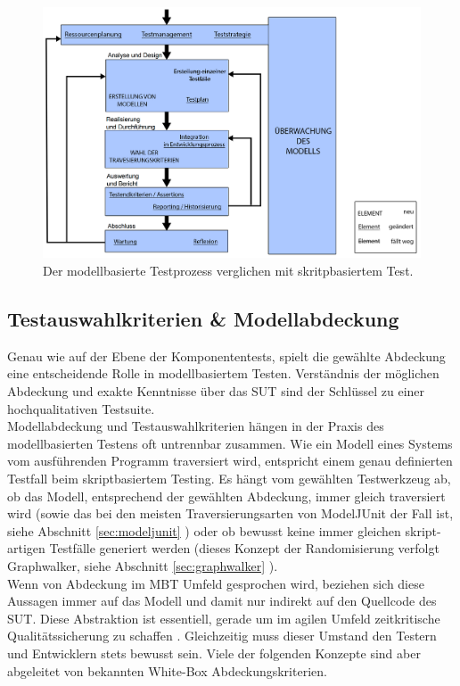 \begin{figure}[h] 
  \centering
     \includegraphics[width=1.1\textwidth]{figures/mbt_vergleich_skript.png}
  \caption{Der modellbasierte Testprozess verglichen mit skritpbasiertem Test.}
  \label{fig:script_vs_mbt}
\end{figure}

\subsection{Testauswahlkriterien \& Modellabdeckung}
\label{sec:coverage}

Genau wie auf der Ebene der Komponententests, spielt die gewählte Abdeckung eine entscheidende Rolle in modellbasiertem Testen. Verständnis der möglichen Abdeckung und exakte Kenntnisse über das \Gls{SUT} sind der Schlüssel zu einer hochqualitativen Testsuite.\\
Modellabdeckung und Testauswahlkriterien hängen in der Praxis des modellbasierten Testens oft untrennbar zusammen. Wie ein Modell eines Systems vom ausführenden Programm traversiert wird, entspricht einem genau definierten Testfall beim skriptbasiertem Testing. Es hängt vom gewählten Testwerkzeug ab, ob das Modell, entsprechend der gewählten Abdeckung, immer gleich traversiert wird (sowie das bei den meisten Traversierungsarten von ModelJUnit der Fall ist, siehe Abschnitt \ref{sec:modeljunit} ) oder ob bewusst keine immer gleichen skript-artigen Testfälle generiert werden (dieses Konzept der Randomisierung verfolgt Graphwalker, siehe Abschnitt \ref{sec:graphwalker} ).\\
Wenn von Abdeckung im \Gls{MBT} Umfeld gesprochen wird, beziehen sich diese Aussagen immer auf das Modell und damit nur indirekt auf den Quellcode des \Gls{SUT}. Diese Abstraktion ist essentiell, gerade um im agilen Umfeld zeitkritische Qualitätssicherung zu schaffen \cite{utting_practical_2007}. Gleichzeitig muss dieser Umstand den Testern und Entwicklern stets bewusst sein. Viele der folgenden Konzepte sind aber abgeleitet von bekannten White-Box Abdeckungskriterien.

